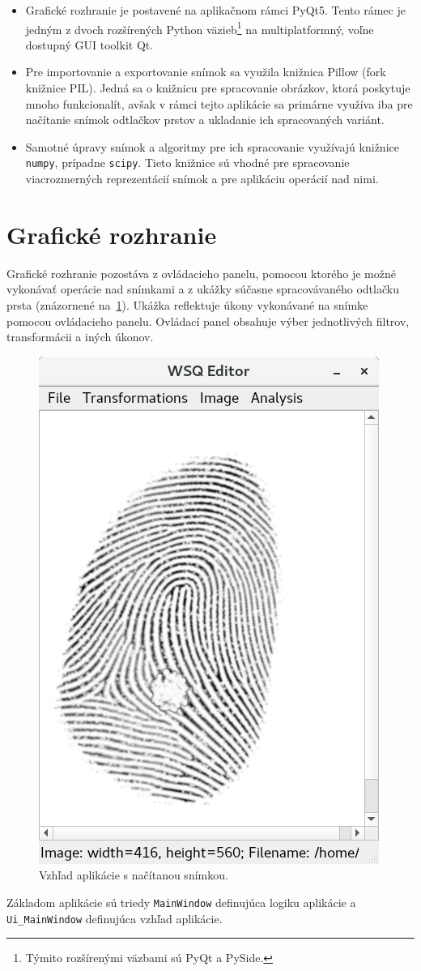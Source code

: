   \begin{itemize}
    \item Grafické rozhranie je postavené na aplikačnom rámci PyQt5. Tento rámec je jedným z dvoch rozšírených Python väzieb\footnote{Týmito rozšírenými
          väzbami sú PyQt a PySide.}
          na multiplatformný, voľne dostupný GUI toolkit Qt.
    \item Pre importovanie a exportovanie snímok sa využila knižnica Pillow (fork knižnice PIL). Jedná sa o knižnicu pre spracovanie obrázkov,
          ktorá poskytuje mnoho funkcionalít, avšak v rámci tejto aplikácie sa primárne využíva iba pre načítanie snímok odtlačkov prstov a ukladanie
          ich spracovaných variánt.
    \item Samotné úpravy snímok a algoritmy pre ich spracovanie využívajú knižnice \texttt{numpy}, prípadne \texttt{scipy}. Tieto knižnice sú vhodné pre
          spracovanie viacrozmerných reprezentácií snímok a pre aplikáciu operácií nad nimi.
  \end{itemize}

  \section{Grafické rozhranie}
  Grafické rozhranie pozostáva z ovládacieho panelu, pomocou ktorého je možné vykonávať operácie nad snímkami a z ukážky súčasne
  spracovávaného odtlačku prsta (znázornené na~{\ref{obr:app}}). Ukážka reflektuje úkony vykonávané na snímke pomocou ovládacieho panelu. Ovládací panel
  obsahuje výber jednotlivých filtrov, transformácii a iných úkonov.
  \begin{figure}[h]
    \centering
    \includegraphics[width=0.4\linewidth]{obrazky-figures/app.png}
    \caption{Vzhľad aplikácie s načítanou snímkou.}
    \label{obr:app}
  \end{figure}
  Základom aplikácie sú triedy \texttt{MainWindow} definujúca logiku aplikácie a \texttt{Ui\_MainWindow} definujúca vzhľad aplikácie.

